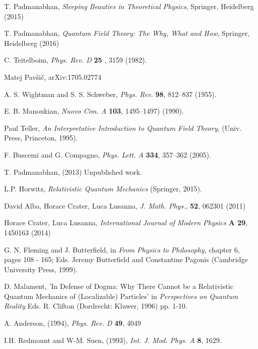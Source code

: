 \documentclass[12pt]{article}
\begin{document}
\begin{thebibliography}{000}
T. Padmanabhan, \textit{Sleeping Beauties in Theoretical Physics}, Springer, Heidelberg (2015)

 
T. Padmanabhan, \textit{Quantum Field Theory: The Why, What and How}, Springer, Heidelberg (2016)
 
 C. Teitelboim, \textit{Phys. Rev. D} \textbf{25} , 3159 (1982). 


  Matej  Pav\v si\v c, arXiv:1705.02774

  A. S. Wightman and S. S. Schweber, {\it Phys. Rev.} {\bf 98}, 812--837 (1955).
 
  E. B. Manoukian,  {\it Nuovo Cim. A} {\bf 103},
1495--1497) (1990).
 
  Paul Teller, {\it An Interpretative Introduction to Quantum Field Theory},
(Univ. Press, Princeton, 1995).
 
  F. Buscemi and G. Compagno, 
{\it Phys. Lett. A} {\bf 334}, 357--362 (2005).

T. Padmanabhan, (2013) Unpublished work.


L.P. Horwitz, \textit{Relativistic Quantum Mechanics} (Springer, 2015).


David Alba, Horace Crater, Luca Lusanna, \textit{J. Math. Phys.}, \textbf{52}, 062301 (2011)  

Horace Crater, Luca Lusanna,
\textit{International Journal of Modern Physics} \textbf{A 29}, 1450163 (2014)


G. N. Fleming and J. Butterfield, in \textit{From Physics to Philosophy,} chapter 6, pages 108 - 165; Eds. Jeremy Butterfield and Constantine
Pagonis (Cambridge University
Press, 1999).

D. Malament, 'In Defense of Dogma: Why There Cannot be a Relativistic
Quantum Mechanics of (Localizable) Particles' in \textit{Perspectives
on Quantum Reality} Eds. R. Clifton (Dordrecht: Kluwer, 1996) pp. 1-10.

  A. Anderson, (1994), \textit{Phys. Rev. D} \textbf{49}, 4049

   I.H. Redmount and W-M. Suen, (1993), \textit{Int. J. Mod. Phys. A} \textbf{8}, 1629.


\end{thebibliography}
\end{document}
